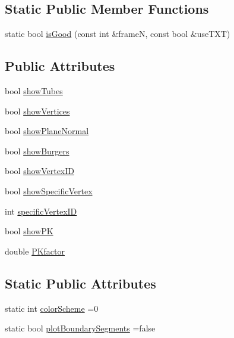 \subsection*{Static Public Member Functions}
\begin{DoxyCompactItemize}
\item 
static bool \hyperlink{classmodel_1_1_spline_plotter_a11808edd367993243286cefaf785b2d5}{is\+Good} (const int \&frame\+N, const bool \&use\+T\+X\+T)
\end{DoxyCompactItemize}
\subsection*{Public Attributes}
\begin{DoxyCompactItemize}
\item 
bool \hyperlink{classmodel_1_1_spline_plotter_aba9675d91bed88b0186cbf729a74451d}{show\+Tubes}
\item 
bool \hyperlink{classmodel_1_1_spline_plotter_a1f44c143939ff209d75a0b5c8d977887}{show\+Vertices}
\item 
bool \hyperlink{classmodel_1_1_spline_plotter_a2601b9ddd2092997aef3eda955f9ccc5}{show\+Plane\+Normal}
\item 
bool \hyperlink{classmodel_1_1_spline_plotter_a0140de0e383162a573a03617855270dc}{show\+Burgers}
\item 
bool \hyperlink{classmodel_1_1_spline_plotter_a8d9c7b535dd59ae45dc245475a8d2cab}{show\+Vertex\+I\+D}
\item 
bool \hyperlink{classmodel_1_1_spline_plotter_a5c32c4bebd33e41d46fa36a2d0418476}{show\+Specific\+Vertex}
\item 
int \hyperlink{classmodel_1_1_spline_plotter_aa8b770cfb4242e3b8b3660c90306e535}{specific\+Vertex\+I\+D}
\item 
bool \hyperlink{classmodel_1_1_spline_plotter_af18e54b835b0983b17f8c599156d3d34}{show\+P\+K}
\item 
double \hyperlink{classmodel_1_1_spline_plotter_ae429f7f5a86cae4e202766034cbbbeef}{P\+Kfactor}
\end{DoxyCompactItemize}
\subsection*{Static Public Attributes}
\begin{DoxyCompactItemize}
\item 
static int \hyperlink{classmodel_1_1_spline_plotter_a6c2c63eb67d6a385237f647fb4743b23}{color\+Scheme} =0
\item 
static bool \hyperlink{classmodel_1_1_spline_plotter_a8ed220be6d2afa539f9fe39e172213e0}{plot\+Boundary\+Segments} =false
\end{DoxyCompactItemize}


